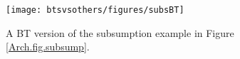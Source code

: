 \begin{figure}[htbp]
\begin{center}
\texttt{[image: btsvsothers/figures/subsBT]}
\caption{A BT version of the subsumption example in Figure  \ref{Arch.fig.subsump}. }
\label{btsvsothers:fig:subsBT_v2}
\end{center}
\end{figure}



%
%
%
